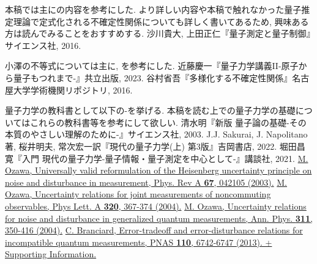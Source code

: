


\let\oldaddcontentsline\addcontentsline
\renewcommand{\addcontentsline}[3]{}
\begin{thebibliography}{99}
\item[]本稿では主に\cite{sagawaueda}の内容を参考にした. より詳しい内容や本稿で触れなかった量子推定理論で定式化される不確定性関係についても詳しく書いてあるため, 興味ある方は読んでみることをおすすめする.
沙川貴大, 上田正仁『量子測定と量子制御』サイエンス社, 2016.
\item[]小澤の不等式については主に\cite{kondo}, \cite{tanimurashogo}を参考にした. 
近藤慶一『量子力学講義II-原子から量子もつれまで-』共立出版, 2023.
谷村省吾『多様化する不確定性関係』名古屋大学学術機関リポジトリ, 2016.
\\
\item[] 量子力学の教科書として以下の\cite{simizu}-\cite{hottaqu}を挙げる. 
本稿を読む上での量子力学の基礎についてはこれらの教科書等を参考にして欲しい. 
清水明『新版 量子論の基礎-その本質のやさしい理解のために-』サイエンス社, 2003.
J.J. Sakurai, J. Napolitano著, 桜井明夫, 常次宏一訳『現代の量子力学(上) 第3版』吉岡書店, 2022.
堀田昌寛『入門 現代の量子力学-量子情報・量子測定を中心として-』講談社, 2021.
\href{https://journals.aps.org/pra/abstract/10.1103/PhysRevA.67.042105}{M. Ozawa, Universally valid reformulation of the Heisenberg uncertainty principle on noise and  disturbance in measurement, Phys. Rev A \textbf{67}, 042105 (2003).}
\href{https://www.sciencedirect.com/science/article/pii/S0375960103017560#section-cited-by}{M. Ozawa, Uncertainty relations for joint measurements of noncommuting observables, Phys Lett. A \textbf{320}, 367-374 (2004).}
\href{https://www.sciencedirect.com/science/article/pii/S0003491604000089}{M. Ozawa, Uncertainty relations for noise and disturbance in generalized quantum measurements, Ann. Phys. \textbf{311}, 350-416 (2004).}
\href{https://www.pnas.org/doi/abs/10.1073/pnas.1219331110}{C. Branciard, Error-tradeoff and error-disturbance relations for incompatible quantum measurements, PNAS \textbf{110}, 6742-6747 (2013).  + Supporting Information.}
\end{thebibliography}
\let\addcontentsline\oldaddcontentsline

